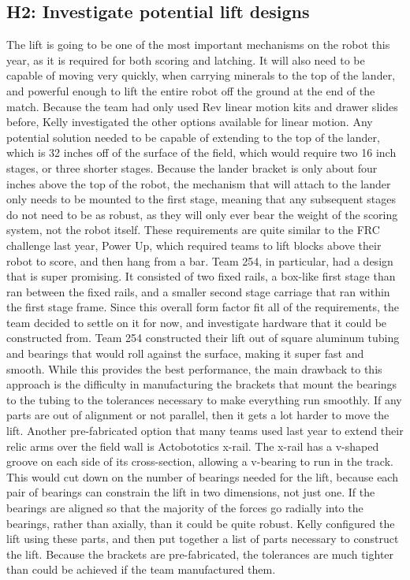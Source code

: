 \documentclass{article}
\begin{document}
\subsection{H2: Investigate potential lift designs}

The lift is going to be one of the most important mechanisms on the robot this year, as it is required for both scoring and latching. It will also need to be capable of moving very quickly, when carrying minerals to the top of the lander, and powerful enough to lift the entire robot off the ground at the end of the match. Because the team had only used Rev linear motion kits and drawer slides before, Kelly investigated the other options available for linear motion. Any potential solution needed to be capable of extending to the top of the lander, which is 32 inches off of the surface of the field, which would require two 16 inch stages, or three shorter stages. Because the lander bracket is only about four inches above the top of the robot, the mechanism that will attach to the lander only needs to be mounted to the first stage, meaning that any subsequent stages do not need to be as robust, as they will only ever bear the weight of the scoring system, not the robot itself. These requirements are quite similar to the FRC challenge last year, Power Up, which required teams to lift blocks above their robot to score, and then hang from a bar. Team 254, in particular, had a design that is super promising. It consisted of two fixed rails, a box-like first stage than ran between the fixed rails, and a smaller second stage carriage that ran within the first stage frame. Since this overall form factor fit all of the requirements, the team decided to settle on it for now, and investigate hardware that it could be constructed from. Team 254 constructed their lift out of square aluminum tubing and bearings that would roll against the surface, making it super fast and smooth. While this provides the best performance, the main drawback to this approach is the difficulty in manufacturing the brackets that mount the bearings to the tubing to the tolerances necessary to make everything run smoothly. If any parts are out of alignment or not parallel, then it gets a lot harder to move the lift. Another pre-fabricated option that many teams used last year to extend their relic arms over the field wall is Actobototics x-rail. The x-rail has a v-shaped groove on each side of its cross-section, allowing a v-bearing to run in the track. This would cut down on the number of bearings needed for the lift, because each pair of bearings can constrain the lift in two dimensions, not just one. If the bearings are aligned so that the majority of the forces go radially into the bearings, rather than axially, than it could be quite robust. Kelly configured the lift using these parts, and then put together a list of parts necessary to construct the lift. Because the brackets are pre-fabricated, the tolerances are much tighter than could be achieved if the team manufactured them. 
\end{document}
